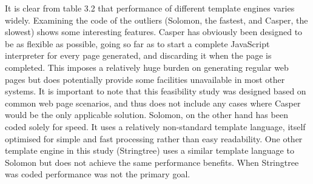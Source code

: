 \begin{table}[ht!]
\caption{Time (ms) taken for 10,000 runs by template engine and scenario}
\end{table}

It is clear from table 3.2 that performance of different template engines varies widely. Examining the code of the outliers (Solomon, the fastest, and Casper, the slowest) shows some interesting features. Casper has obviously been designed to be as flexible as possible, going so far as to start a complete JavaScript interpreter for every page generated, and discarding it when the page is completed. This imposes a relatively huge burden on generating regular web pages but does potentially provide some facilities unavailable in most other systems. It is important to note that this feasibility study was designed based on common web page scenarios, and thus does not include any cases where Casper would be the only applicable solution. Solomon, on the other hand has been coded solely for speed. It uses a relatively non-standard template language, itself optimised for simple and fast processing rather than easy readability. One other template engine in this study (Stringtree) uses a similar template language to Solomon but does not achieve the same performance benefits. When Stringtree was coded performance was not the primary goal.

